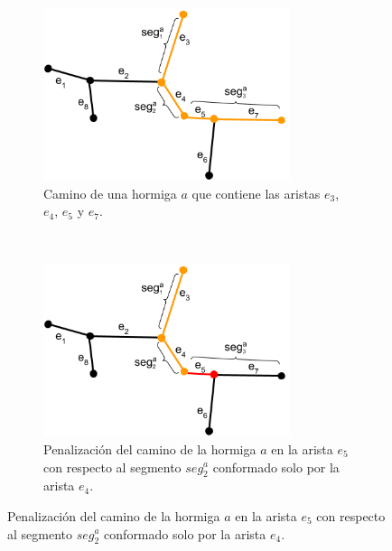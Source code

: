  \begin{figure}[h]
    \centering
    \begin{subfigure}[t]{0.48\textwidth}
        \centering
        \includegraphics[height=2in]{imagenes/ant_segments_complex_case_1.png}
        \caption{Camino de una hormiga $a$ que contiene las aristas $e_3$, $e_4$, $e_5$ y $e_7$.}
        \label{fig:segmentComplexCase1}
    \end{subfigure}%
    ~ \hspace{0.5cm}
    \begin{subfigure}[t]{0.48\textwidth}
        \centering
        \includegraphics[height=2in]{imagenes/ant_segments_complex_case_2.png}
        \caption{Penalizaci\'on del camino de la hormiga $a$ en la arista $e_5$ con respecto al segmento $seg^{a}_2$ conformado solo por la arista $e_4$.}
        \label{fig:segmentComplexCase2}
    \end{subfigure}


\end{figure}
